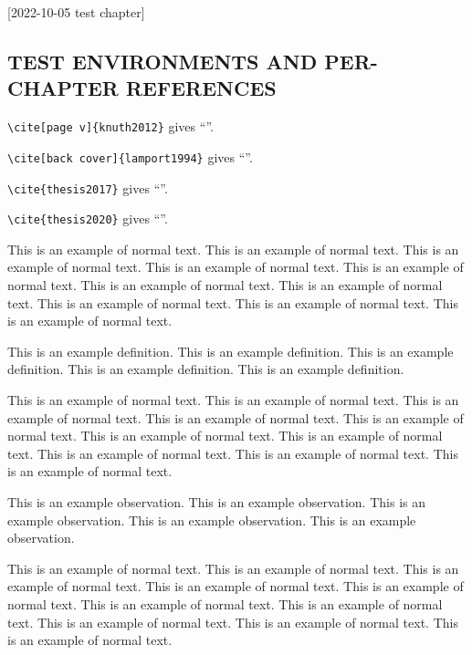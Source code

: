 [2022-10-05 test chapter]

\begin{refsection}

\chapter{TEST ENVIRONMENTS AND PER-CHAPTER REFERENCES}

\verb+\cite[page v]{knuth2012}+ gives ``\cite[page v]{knuth2012}''.

\noindent
\verb+\cite[back cover]{lamport1994}+ gives ``\cite[back cover]{lamport1994}''.

\noindent
\verb+\cite{thesis2017}+ gives ``\cite{thesis2017}''.

\noindent
\verb+\cite{thesis2020}+ gives ``\cite{thesis2020}''.

This is an example of normal text.
This is an example of normal text.
This is an example of normal text.
This is an example of normal text.
This is an example of normal text.
This is an example of normal text.
This is an example of normal text.
This is an example of normal text.
This is an example of normal text.
This is an example of normal text.

\begin{definition}
  This is an example definition.
  This is an example definition.
  This is an example definition.
  This is an example definition.
  This is an example definition.
\end{definition}

This is an example of normal text.
This is an example of normal text.
This is an example of normal text.
This is an example of normal text.
This is an example of normal text.
This is an example of normal text.
This is an example of normal text.
This is an example of normal text.
This is an example of normal text.
This is an example of normal text.

\begin{observation}
  This is an example observation.
  This is an example observation.
  This is an example observation.
  This is an example observation.
  This is an example observation.
\end{observation}

This is an example of normal text.
This is an example of normal text.
This is an example of normal text.
This is an example of normal text.
This is an example of normal text.
This is an example of normal text.
This is an example of normal text.
This is an example of normal text.
This is an example of normal text.
This is an example of normal text.


\end{refsection}
